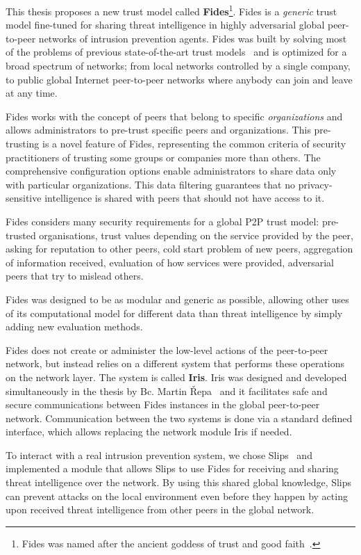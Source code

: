 This thesis proposes a new trust model called \textbf{Fides}\footnote{Fides was named after the ancient goddess of trust and good faith~\cite{enwiki:1086924565}.}.
Fides is a \textit{generic} trust model fine-tuned for sharing threat intelligence in highly adversarial global peer-to-peer networks of intrusion prevention agents.
Fides was built by solving most of the problems of previous state-of-the-art trust models~\cite{sort, dita} and is optimized for a broad spectrum of networks; from local networks controlled by a single company, to public global Internet peer-to-peer networks where anybody can join and leave at any time.

Fides works with the concept of peers that belong to specific \textit{organizations} and allows administrators to pre-trust specific peers and organizations. This pre-trusting is a novel feature of Fides, representing the common criteria of security practitioners of trusting some groups or companies more than others. The comprehensive configuration options enable administrators to share data only with particular organizations. This data filtering guarantees that no privacy-sensitive intelligence is shared with peers that should not have access to it.

Fides considers many security requirements for a global P2P trust model: pre-trusted organisations, trust values depending on the service provided by the peer, asking for reputation to other peers, cold start problem of new peers, aggregation of information received, evaluation of how services were provided, adversarial peers that try to mislead others.

Fides was designed to be as modular and generic as possible, allowing other uses of its computational model for different data than threat intelligence by simply adding new evaluation methods.

Fides does not create or administer the low-level actions of the peer-to-peer network, but instead relies on a different system that performs these operations on the network layer. The system is called \textbf{Iris}. Iris was designed and developed simultaneously in the thesis by Bc. Martin Řepa~\cite{nl} and it facilitates safe and secure communications between Fides instances in the global peer-to-peer network. Communication between the two systems is done via a standard defined interface, which allows replacing the network module Iris if needed.

To interact with a real intrusion prevention system, we chose Slips~\cite{slips} and implemented a module that allows Slips to use Fides for receiving and sharing threat intelligence over the network. 
By using this shared global knowledge, Slips can prevent attacks on the local environment even before they happen by acting upon received threat intelligence from other peers in the global network.

